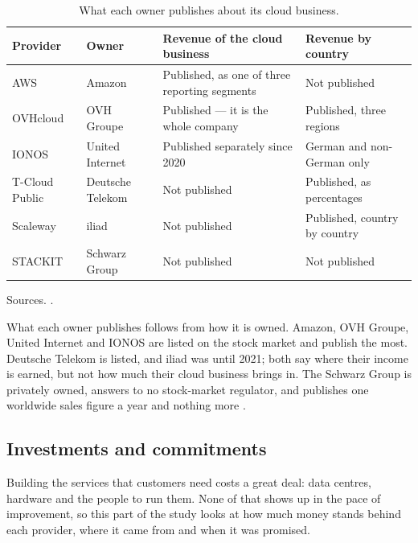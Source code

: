 \begin{table}[htbp]
  \centering
  \caption{What each owner publishes about its cloud business.}
  \label{tab:study3-disclosure}
  \footnotesize
  \begin{tabularx}{\textwidth}{@{}l l X l@{}}
    \toprule
    Provider & Owner & Revenue of the cloud business & Revenue by country \\
    \midrule
    \acs{AWS}      & Amazon           & Published, as one of three reporting segments & Not published \\
    OVHcloud       & OVH Groupe       & Published --- it is the whole company          & Published, three regions \\
    IONOS          & United Internet  & Published separately since 2020                & German and non-German only \\
    T-Cloud Public & Deutsche Telekom & Not published                                  & Published, as percentages \\
    Scaleway       & iliad            & Not published                                  & Published, country by country \\
    STACKIT        & Schwarz Group    & Not published                                  & Not published \\
    \bottomrule
  \end{tabularx}

  \vspace{2pt}
  \footnotesize
  Sources. \cite{Amazon_10K_2025,OVHcloud_URD_2025,IONOS_AR_2025,UnitedInternet_AR_2025,%
  DT_AR_2025,Iliad_AFR_2025,Schwarz_Figures_FY2025}.
\end{table}

What each owner publishes follows from how it is owned. Amazon, OVH Groupe, United
Internet and IONOS are listed on the stock market and publish the most. Deutsche
Telekom is listed, and iliad was until 2021; both say where their income is earned,
but not how much their cloud business brings in. The Schwarz Group is privately
owned, answers to no stock-market regulator, and publishes one worldwide sales
figure a year and nothing more \cite{Schwarz_Figures_FY2025}.


\subsection{Investments and commitments}
\label{sec:study3-investment}

Building the services that customers need costs a great deal: data centres,
hardware and the people to run them. None of that shows up in the pace of
improvement, so this part of the study looks at how much money stands behind each
provider, where it came from and when it was promised.

